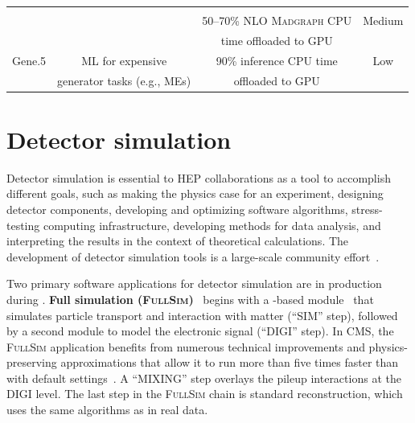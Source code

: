 \begin{table}[tbph]
\begin{tabular}{|c|c|c|c|}
    \cellcolor{tablerowheader}
           &    &    &   \\
    \cellcolor{tablerowheader}
           &    &   {50--70\% NLO \textsc{Madgraph} CPU }      &   {Medium} \\
     \cellcolor{tablerowheader}
           &    &   {time offloaded to GPU}      &   \\
           \hline
    \cellcolor{tablerowheader}
  Gene.5   &   {ML for expensive} &   {90\% inference CPU time} & Low     \\
    \cellcolor{tablerowheader}
           &   {generator tasks (e.g., MEs)}  &   {offloaded to GPU} &         \\ \hline
    \end{tabular}
    \label{tab:gen-improvements}
\end{table}

\clearpage

%
%
% 
\section{Detector simulation}
\label{sec:Simulation}

Detector simulation is essential to \gls{HEP} collaborations as a tool to accomplish different goals, such as making the physics case for an experiment, designing detector components, developing and optimizing software algorithms, stress-testing computing infrastructure, developing methods for data analysis, and interpreting the results in the context of theoretical calculations. The development of detector simulation tools is a large-scale community effort~\cite{HEPSoftwareFoundation:2018fmg,Apostolakis:2022nnf}.

Two primary software applications for detector simulation are in production during \PhaseOne. \textbf{Full simulation (\textsc{FullSim})}~\cite{Lange:2015sba, Hildreth:2015kps, Hildreth:2017vpw, CMS:2021dly, Srimanobhas:2024nmy} begins with a  \GEANTfour-based module~\cite{GEANT4:2002zbu,Allison:2016lfl} that simulates particle transport and interaction with matter (``\gls{SIM}'' step), followed by a second module to model the electronic signal (``\gls{DIGI}'' step). In CMS, the \textsc{FullSim} application benefits from numerous technical improvements and physics-preserving approximations that allow it to run more than five times faster than \GEANTfour with default settings~\cite{Pedro:2018jqu,Srimanobhas:2024nmy}. A ``MIXING'' step overlays the pileup interactions at the \gls{DIGI} level. The last step in the \textsc{FullSim} chain is standard reconstruction, which uses the same algorithms as in real data.

